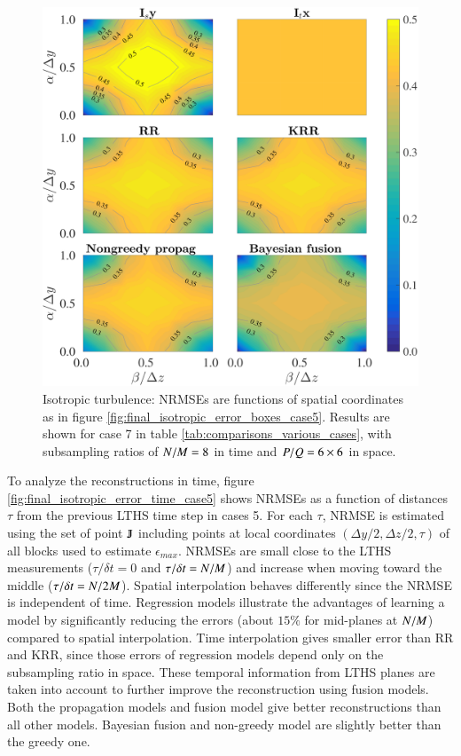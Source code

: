 \begin{figure}[h]
\begin{center}
\includegraphics[width = 0.8\columnwidth]{./images/comparisons/isotropic/compare_boxin4HWs_sspacing6_tspacing8.png}
\caption{\label{fig:final_isotropic_error_boxes_case7} Isotropic turbulence: NRMSEs are functions of spatial coordinates as in figure \ref{fig:final_isotropic_error_boxes_case5}. Results are shown for case 7 in table \ref{tab:comparisons_various_cases}, with subsampling ratios of $ N/M = 8 $ in time and $ P/Q = 6 \times 6 $ in space.}
\end{center}
\end{figure}

To analyze the reconstructions in time, figure \ref{fig:final_isotropic_error_time_case5} shows NRMSEs as a function of distances $ \tau $ from the previous LTHS time step in cases 5. For each $ \tau $, NRMSE is estimated using the set of point $ \varmathbb{J}$ including points at local coordinates $ (\Delta y/2,\Delta z/2, \tau) $ of all blocks used to estimate $ \epsilon_{max} $. NRMSEs are small close to the LTHS measurements ($ \tau/\delta t=0 $ and $ \tau/\delta t=N/M $) and increase when moving toward the middle ($ \tau/\delta t=N/2M $). Spatial interpolation behaves differently since the NRMSE is independent of time. Regression models illustrate the advantages of learning a model by significantly reducing the errors (about $ 15 \% $ for mid-planes at $ N/M $) compared to spatial interpolation. Time interpolation gives smaller error than RR and KRR, since those errors of regression models depend only on the subsampling ratio in space. These temporal information from LTHS planes are taken into account to further improve the reconstruction using fusion models. Both the propagation models and fusion model give better reconstructions than all other models. Bayesian fusion and non-greedy model are slightly better than the greedy one.

